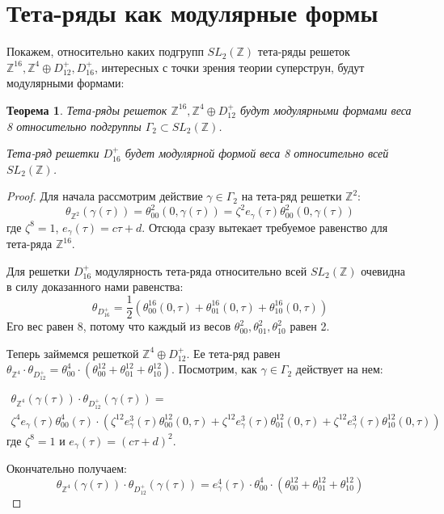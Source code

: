 \documentclass{article}
\newcommand{\ZZ}{\mathbb{Z}}
\theoremstyle{break}
\newtheorem{theorem}{Теорема}[section]
\begin{document}
\section{Тета-ряды как модулярные формы}

Покажем, относительно каких подгрупп $SL_2(\ZZ)$ тета-ряды решеток $\ZZ^{16}, \ZZ^4 \oplus D_{12}^+, D_{16}^+$, интересных с точки зрения теории суперструн, будут модулярными формами:


\begin{theorem}
	Тета-ряды решеток $\ZZ^{16},  \ZZ^4 \oplus D_{12}^+$ будут модулярными формами
	веса 8 относительно подгруппы $\Gamma_2 \subset SL_2(\ZZ)$.
	
	Тета-ряд решетки $D_{16}^+$ будет модулярной формой веса 8 относительно всей $SL_2(\ZZ)$.
\end{theorem}

\begin{proof}
	Для начала рассмотрим действие $\gamma \in \Gamma_2$ на тета-ряд решетки $\ZZ^{2}$:
	\begin{equation}
		\theta_{\ZZ^2}(\gamma(\tau))=\theta_{00}^2(0, \gamma(\tau)) = \zeta^2 e_{\gamma}(\tau) \theta^2_{00}(0, \gamma(\tau))
	\end{equation}
	где $\zeta^8=1$, $e_\gamma(\tau)=c \tau + d$. Отсюда сразу вытекает требуемое равенство для тета-ряда $\ZZ^{16}$.
	
	Для решетки $D_{16}^+$ модулярность тета-ряда относительно всей $SL_2(\ZZ)$ очевидна в силу доказанного нами равенства:
	\begin{equation}\theta_{D_{16}^+}=\frac{1}{2}(\theta_{00}^{16}(0, \tau) + \theta_{01}^{16}(0, \tau) + \theta_{10}^{16}(0, \tau))\end{equation}
	Его вес равен 8, потому что каждый из весов 
	$\theta_{00}^2, \theta_{01}^2, \theta_{10}^2$ равен 2.
	
	Теперь займемся решеткой $\ZZ^4 \oplus D_{12}^+$. Ее тета-ряд равен $\theta_{\ZZ^4} \cdot \theta_{D_{12}^+} = \theta_{00}^4 \cdot (\theta_{00}^{12} + \theta_{01}^{12} + \theta_{10}^{12})$. Посмотрим, как $\gamma \in \Gamma_2$ действует на нем:

\begin{equation*}
	\begin{split}
		\theta_{\ZZ^4}(\gamma(\tau)) \cdot \theta_{D_{12}^+}(\gamma(\tau)) = \\		
		\zeta^4 e_{\gamma}(\tau)\theta_{00}^4 (\tau) \cdot
		(
			\zeta^{12} e_{\gamma}^3(\tau)\theta_{00}^{12} (0, \tau)
			+ \zeta^{12} e_{\gamma}^3(\tau)\theta_{01}^{12} (0, \tau)
			+ \zeta^{12} e_{\gamma}^3(\tau)\theta_{10}^{12} (0, \tau)
		)
	\end{split}
\end{equation*}
	где $\zeta^8=1$ и $e_\gamma(\tau) = (c\tau + d)^2$.
	
	Окончательно получаем:
	\begin{equation}
		\theta_{\ZZ^4}(\gamma(\tau)) \cdot \theta_{D_{12}^+}(\gamma(\tau))
		=
		e_{\gamma}^4(\tau)\cdot \theta_{00}^4 \cdot (\theta_{00}^{12} + \theta_{01}^{12} + \theta_{10}^{12})
	\end{equation}
	
\end{proof}
\end{document}
